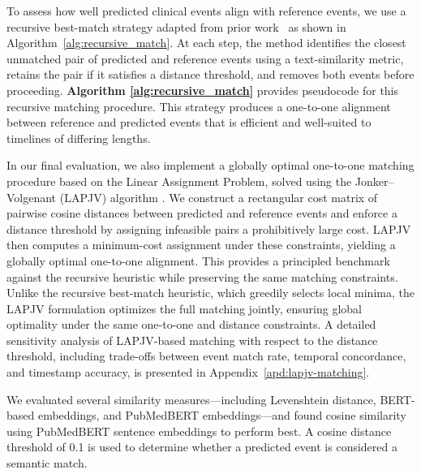 \documentclass[pdflatex,sn-mathphys-num]{sn-jnl}%
\theoremstyle{thmstyleone}%
\theoremstyle{thmstyletwo}%
\theoremstyle{thmstylethree}%
\begin{document}
To assess how well predicted clinical events align with reference events, we use a recursive
best-match strategy adapted from prior work~\cite{wang2025large} as shown in Algorithm~\ref{alg:recursive_match}. At each step, the method
identifies the closest unmatched pair of predicted and reference events using a text-similarity
metric, retains the pair if it satisfies a distance threshold, and removes both events before
proceeding. \textbf{Algorithm \ref{alg:recursive_match}} provides pseudocode for this recursive matching procedure.
This strategy produces a one-to-one alignment between reference and predicted events that is
efficient and well-suited to timelines of differing lengths. 

In our final evaluation, we also implement a globally optimal one-to-one matching procedure based on the Linear Assignment Problem, solved using the Jonker–Volgenant (LAPJV) algorithm \citep{jonker1987shortest}. We construct a rectangular cost matrix of pairwise cosine distances between predicted and reference events and enforce a distance threshold by assigning infeasible pairs a prohibitively large cost. LAPJV then computes a minimum-cost assignment under these constraints, yielding a globally optimal one-to-one alignment. This provides a principled benchmark against the recursive heuristic while preserving the same matching constraints. Unlike the recursive best-match heuristic, which greedily selects local minima, the LAPJV formulation optimizes the full matching jointly, ensuring global optimality under the same one-to-one and distance constraints. A detailed sensitivity analysis of LAPJV-based matching with respect to the distance threshold,
including trade-offs between event match rate, temporal concordance, and timestamp accuracy, is presented in Appendix~\ref{apd:lapjv-matching}. 


We evaluated several similarity measures—including Levenshtein distance, BERT-based
embeddings, and PubMedBERT embeddings—and found cosine similarity using PubMedBERT
sentence embeddings to perform best. A cosine distance threshold of 0.1 is used to determine
whether a predicted event is considered a semantic match.
\end{document}
